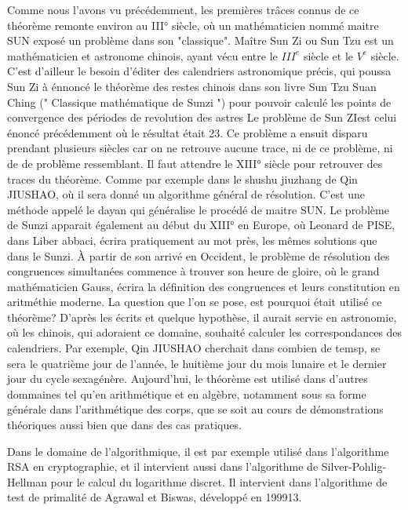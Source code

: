 \documentclass[a4paper, 11pt]{report}
\begin{document}
Comme nous l'avons vu précédemment, les premières trâces connus de ce théorème remonte environ au III° siècle, où un mathématicien nommé maitre SUN exposé un problème dans son "classique". Maître Sun Zi ou Sun Tzu est un mathématicien et astronome chinois, ayant vécu entre le $III^e$ siècle et le $V^e$ siècle.
C'est d'ailleur le besoin d'éditer des calendriers astronomique précis, qui poussa Sun Zi à 
énnoncé le théorème des restes chinois dans son livre  Sun Tzu Suan Ching (" Classique mathématique de Sunzi ") 
pour pouvoir calculé les points de convergence des périodes de revolution des astres
Le problème de Sun ZIest celui énoncé précédemment où le résultat était 23. Ce problème a ensuit disparu prendant plusieurs siècles car on ne retrouve aucune trace, ni de ce problème, ni de de problème ressemblant. Il faut attendre
le XIII° siècle pour retrouver des traces du théorème. Comme par exemple dans le shushu jiuzhang de Qin JIUSHAO, où il sera donné un algorithme général de résolution. C'est une méthode appelé
le dayan qui généralise le procédé de maitre SUN. Le problème de Sunzi apparait également au début du XIII° en Europe, où Leonard de PISE, dans Liber abbaci, écrira pratiquement au mot près, les mêmes solutions
que dans le Sunzi. À partir de son arrivé en Occident, le problème de résolution des congruences simultanées commence à trouver son heure de gloire, où le grand mathématicien Gauss, écrira la définition des congruences et 
leurs constitution en aritméthie moderne.\newline
La question que l'on se pose, est pourquoi était utilisé ce théorème? D'après les écrits et quelque hypothèse, il aurait servie en astronomie, où les chinois, qui adoraient ce domaine, souhaité calculer les correspondances des calendriers.
Par exemple, Qin JIUSHAO cherchait dans combien de temsp, se sera le quatrième jour de l'année, le huitième jour du mois lunaire et le dernier jour du cycle sexagénère. \newline
Aujourd'hui, le théorème est utilisé dans d'autres dommaines tel qu'en arithmétique et en algèbre, notamment sous sa forme générale dans l'arithmétique des corps, 
que se soit au cours de démonstrations théoriques aussi bien que dans des cas pratiques.

Dans le domaine de l'algorithmique, il est par exemple utilisé dans l'algorithme RSA en cryptographie,
et il intervient aussi dans l'algorithme de Silver-Pohlig-Hellman pour le calcul du logarithme discret. 
Il intervient dans l'algorithme de test de primalité de Agrawal et Biswas, développé en 199913.
\end{document}
